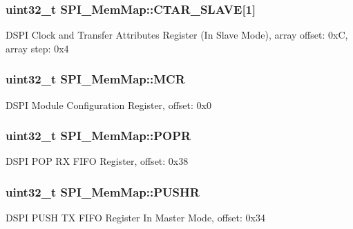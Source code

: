 \subsubsection[{C\+T\+A\+R\+\_\+\+S\+L\+A\+V\+E}]{\setlength{\rightskip}{0pt plus 5cm}uint32\+\_\+t S\+P\+I\+\_\+\+Mem\+Map\+::\+C\+T\+A\+R\+\_\+\+S\+L\+A\+V\+E\mbox{[}1\mbox{]}}\label{struct_s_p_i___mem_map_a4824e400ced2bf2bd5c89e95e7ef55d6}
D\+S\+P\+I Clock and Transfer Attributes Register (In Slave Mode), array offset\+: 0x\+C, array step\+: 0x4 \hypertarget{struct_s_p_i___mem_map_a6474aa986b81a5477bbe4cb6a2dfe377}{}
\subsubsection[{M\+C\+R}]{\setlength{\rightskip}{0pt plus 5cm}uint32\+\_\+t S\+P\+I\+\_\+\+Mem\+Map\+::\+M\+C\+R}\label{struct_s_p_i___mem_map_a6474aa986b81a5477bbe4cb6a2dfe377}
D\+S\+P\+I Module Configuration Register, offset\+: 0x0 \hypertarget{struct_s_p_i___mem_map_a04b56f8ca2e50d92647fc7b7e2d98715}{}
\subsubsection[{P\+O\+P\+R}]{\setlength{\rightskip}{0pt plus 5cm}uint32\+\_\+t S\+P\+I\+\_\+\+Mem\+Map\+::\+P\+O\+P\+R}\label{struct_s_p_i___mem_map_a04b56f8ca2e50d92647fc7b7e2d98715}
D\+S\+P\+I P\+O\+P R\+X F\+I\+F\+O Register, offset\+: 0x38 \hypertarget{struct_s_p_i___mem_map_a9b91ea535dc969f210119d1cad2a246e}{}
\subsubsection[{P\+U\+S\+H\+R}]{\setlength{\rightskip}{0pt plus 5cm}uint32\+\_\+t S\+P\+I\+\_\+\+Mem\+Map\+::\+P\+U\+S\+H\+R}\label{struct_s_p_i___mem_map_a9b91ea535dc969f210119d1cad2a246e}
D\+S\+P\+I P\+U\+S\+H T\+X F\+I\+F\+O Register In Master Mode, offset\+: 0x34 \hypertarget{struct_s_p_i___mem_map_a22553d476505bf3416a55f681a70774e}{}
